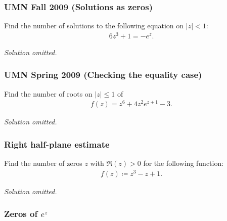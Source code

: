 \hypertarget{umn-fall-2009-solutions-as-zeros}{%
\subsubsection{UMN Fall 2009 (Solutions as
zeros)}\label{umn-fall-2009-solutions-as-zeros}}

\begin{problem}[?]

Find the number of solutions to the following equation on
\({\left\lvert {z} \right\rvert} < 1\):
\begin{align*}
6z^3 + 1 = -e^z
.\end{align*}

\end{problem}

\emph{Solution omitted.}

\hypertarget{umn-spring-2009-checking-the-equality-case}{%
\subsubsection{UMN Spring 2009 (Checking the equality
case)}\label{umn-spring-2009-checking-the-equality-case}}

\begin{problem}[?]

Find the number of roots on \({\left\lvert {z} \right\rvert} \leq 1\) of
\begin{align*}
f(z)=z^{6}+4 z^{2} e^{z+1}-3
.\end{align*}

\end{problem}

\emph{Solution omitted.}

\hypertarget{right-half-plane-estimate}{%
\subsubsection{Right half-plane
estimate}\label{right-half-plane-estimate}}

\begin{problem}[?]

Find the number of zeros \(z\) with \(\Re(z) > 0\) for the following
function:
\begin{align*}
f(z) \coloneqq z^3-z+1
.\end{align*}

\end{problem}

\emph{Solution omitted.}

\hypertarget{zeros-of-ez}{%
\subsubsection{\texorpdfstring{Zeros of
\(e^z\)}{Zeros of e\^{}z}}\label{zeros-of-ez}}

